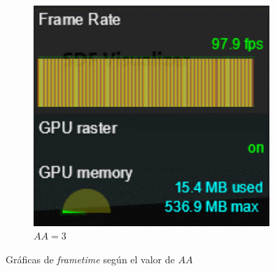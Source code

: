 \begin{figure}[!h]
\begin{subfigure}[c]{0.4\linewidth}
        \includegraphics[width=0.98\textwidth]{Plantilla-TFG-master/img/graficas/frametimeB.png}
        \caption{$AA=3$}
     \end{subfigure}
     \caption{Gráficas de \textit{frametime} según el valor de $AA$}
     \label{fig:frametime}
\end{figure}

